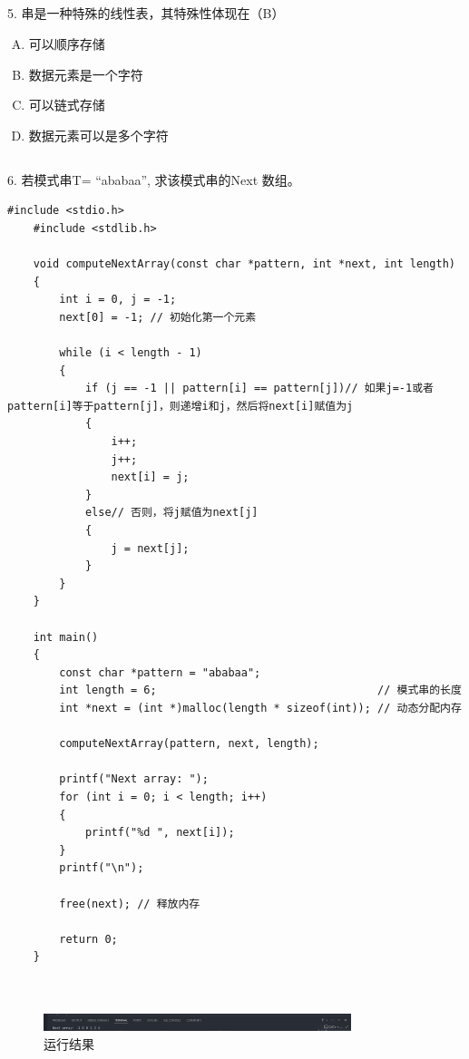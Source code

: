 \documentclass[12pt,hyperref,a4paper,UTF8]{ctexart}
\begin{document}
\subsection{}
5. 串是一种特殊的线性表，其特殊性体现在（B）
\begin{enumerate}[A.]
    \item 可以顺序存储
    \item 数据元素是一个字符
    \item 可以链式存储
    \item 数据元素可以是多个字符
\end{enumerate}

\subsection{}

6. 若模式串T= “ababaa”, 求该模式串的Next 数组。
\begin{lstlisting}[style=CStyle]
    #include <stdio.h>
    #include <stdlib.h> 
    
    void computeNextArray(const char *pattern, int *next, int length)
    {
        int i = 0, j = -1;
        next[0] = -1; // 初始化第一个元素
    
        while (i < length - 1)
        {
            if (j == -1 || pattern[i] == pattern[j])// 如果j=-1或者pattern[i]等于pattern[j]，则递增i和j，然后将next[i]赋值为j
            {
                i++;
                j++;
                next[i] = j;
            }
            else// 否则，将j赋值为next[j]
            {
                j = next[j];
            }
        }
    }
    
    int main()
    {
        const char *pattern = "ababaa";
        int length = 6;                                  // 模式串的长度
        int *next = (int *)malloc(length * sizeof(int)); // 动态分配内存
    
        computeNextArray(pattern, next, length);
    
        printf("Next array: ");
        for (int i = 0; i < length; i++)
        {
            printf("%d ", next[i]);
        }
        printf("\n");
    
        free(next); // 释放内存
    
        return 0;
    }
    
    
\end{lstlisting}

\begin{figure}[H]
    \centering
    \includegraphics[width=0.8\textwidth]{figures/fig1.png}
    \caption{运行结果}
\end{figure}
\end{document}
